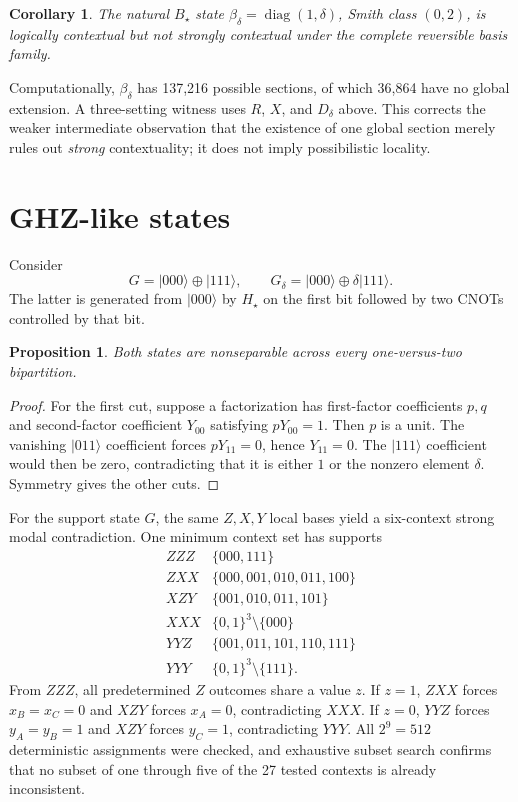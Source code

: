 \documentclass[11pt]{article}
\newtheorem{proposition}{Proposition}
\newtheorem{corollary}{Corollary}
\newcommand{\xorp}{\mathbin{\oplus}}
\newcommand{\ket}[1]{\lvert #1\rangle}
\begin{document}
\begin{corollary}
The natural $B_\star$ state
$\beta_\delta=\operatorname{diag}(1,\delta)$, Smith class $(0,2)$, is
logically contextual but not strongly contextual under the complete reversible
basis family.
\end{corollary}

Computationally, $\beta_\delta$ has 137,216 possible sections, of which
36,864 have no global extension.  A three-setting witness uses
$R$, $X$, and $D_\delta$ above.  This corrects the weaker intermediate
observation that the existence of one global section merely rules out
\emph{strong} contextuality; it does not imply possibilistic locality.

\section{GHZ-like states}

Consider
\[
G=\ket{000}\xorp\ket{111},\qquad
G_\delta=\ket{000}\xorp\delta\ket{111}.
\]
The latter is generated from $\ket{000}$ by $H_\star$ on the first bit followed
by two CNOTs controlled by that bit.

\begin{proposition}
Both states are nonseparable across every one-versus-two bipartition.
\end{proposition}

\begin{proof}
For the first cut, suppose a factorization has first-factor coefficients $p,q$
and second-factor coefficient $Y_{00}$ satisfying $pY_{00}=1$.  Then $p$ is a
unit.  The vanishing $\ket{011}$ coefficient forces $pY_{11}=0$, hence
$Y_{11}=0$.  The $\ket{111}$ coefficient would then be zero, contradicting
that it is either $1$ or the nonzero element $\delta$.  Symmetry gives the
other cuts.
\end{proof}

For the support state $G$, the same $Z,X,Y$ local bases yield a six-context
strong modal contradiction.  One minimum context set has supports
\[
\begin{array}{c|l}
ZZZ&\{000,111\}\\
ZXX&\{000,001,010,011,100\}\\
XZY&\{001,010,011,101\}\\
XXX&\bigl\{0,1\bigr\}^{3}\setminus\{000\}\\
YYZ&\{001,011,101,110,111\}\\
YYY&\bigl\{0,1\bigr\}^{3}\setminus\{111\}.
\end{array}
\]
From $ZZZ$, all predetermined $Z$ outcomes share a value $z$.  If $z=1$,
$ZXX$ forces $x_B=x_C=0$ and $XZY$ forces $x_A=0$, contradicting $XXX$.
If $z=0$, $YYZ$ forces $y_A=y_B=1$ and $XZY$ forces $y_C=1$, contradicting
$YYY$.  All $2^9=512$ deterministic assignments were checked, and exhaustive
subset search confirms that no subset of one through five of the 27 tested
contexts is already inconsistent.
\end{document}
